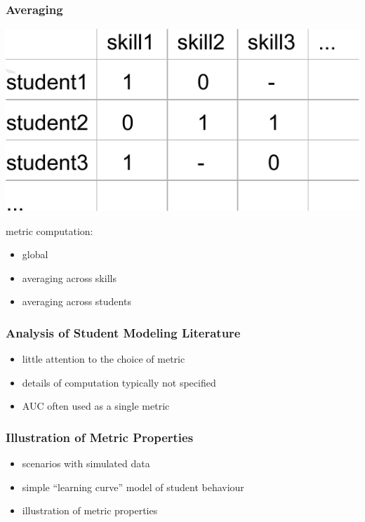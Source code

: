 \documentclass[bigger]{beamer}
\begin{document}
\begin{frame}
  \frametitle{Averaging}

  \begin{center}
    \includegraphics[width=.5\linewidth]{student-item-table}
  \end{center}


  metric computation:
  \begin{itemize}
  \item global
  \item averaging across skills
  \item averaging across students
  \end{itemize}
\end{frame}

\begin{frame}
  \frametitle{Analysis of Student Modeling Literature}

  \begin{itemize}
  \item little attention to the choice of metric
  \item details of computation typically not specified
  \item AUC often used as a single metric
  \end{itemize}
\end{frame}

\begin{frame}
  \frametitle{Illustration of Metric Properties}

  \begin{itemize}
  \item scenarios with simulated data
  \item simple ``learning curve'' model of student behaviour
  \item illustration of metric properties
  \end{itemize}
\end{frame}
\end{document}
